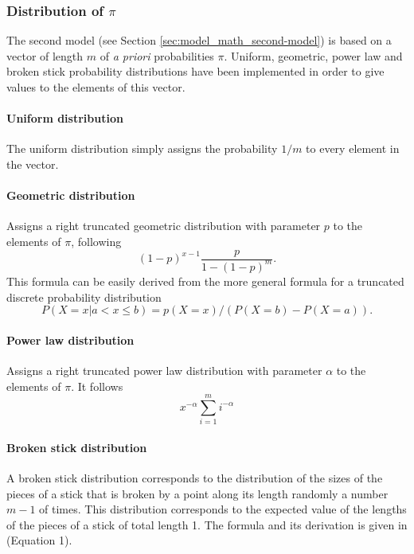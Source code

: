 \subsubsection{Distribution of $\pi$}

The second model (see Section \ref{sec:model_math_second-model}) is based on a vector of length $m$ of \emph{a priori} probabilities $\pi$.
Uniform, geometric, power law and broken stick probability distributions have been implemented in order to give values to the elements of this vector.

\paragraph{Uniform distribution} The uniform distribution simply assigns the probability $1/m$ to every element in the vector.

\paragraph{Geometric distribution} Assigns a right truncated geometric distribution with parameter $p$ to the elements of $\pi$, following
\begin{equation*}
  (1-p)^{x-1} \frac{p}{1 - (1-p)^m}.
\end{equation*}
This formula can be easily derived from the more general formula for a truncated discrete probability distribution
\begin{equation*}
  P(X=x | a < x \leq b) = p(X=x) / (P(X=b) - P(X=a)).
\end{equation*}

\paragraph{Power law distribution} Assigns a right truncated power law distribution with parameter $\alpha$ to the elements of $\pi$.
It follows
\begin{equation*}
  x^{-\alpha} \sum_{i=1}^m i^{-\alpha}
\end{equation*}

\paragraph{Broken stick distribution} A broken stick distribution corresponds to the distribution of the sizes of the pieces of a stick that is broken by a point along its length randomly a number $m-1$ of times.
This distribution corresponds to the expected value of the lengths of the pieces of a stick of total length 1.
The formula and its derivation is given in \cite{Smart1976a} (Equation 1).

